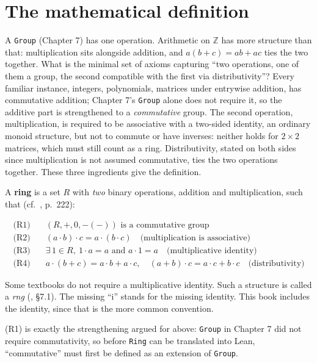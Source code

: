 \section{The mathematical definition}\label{sec:09-rings:01-definition:1}

A \texttt{Group} (Chapter 7) has one operation. Arithmetic on \(\mathbb{Z}\) has more structure than that: multiplication sits alongside addition, and \(a(b+c) = ab+ac\) ties the two together. What is the minimal set of axioms capturing ``two operations, one of them a group, the second compatible with the first via distributivity''? Every familiar instance, integers, polynomials, matrices under entrywise addition, has commutative addition; Chapter 7's \texttt{Group} alone does not require it, so the additive part is strengthened to a \emph{commutative} group. The second operation, multiplication, is required to be associative with a two-sided identity, an ordinary monoid structure, but not to commute or have inverses: neither holds for \(2 \times 2\) matrices, which must still count as a ring. Distributivity, stated on both sides since multiplication is not assumed commutative, ties the two operations together. These three ingredients give the definition.

A \textbf{ring} is a set \(R\) with \emph{two} binary operations, addition and multiplication, such that (cf.~\cite{DummitFoote2003}, p.~222):

\[
\begin{aligned}
\text{(R1)}&\quad (R, +, 0, -(-)) \text{ is a commutative group} \\
\text{(R2)}&\quad (a \cdot b) \cdot c = a \cdot (b \cdot c) \quad \text{(multiplication is associative)} \\
\text{(R3)}&\quad \exists\, 1 \in R,\ 1 \cdot a = a \text{ and } a \cdot 1 = a \quad \text{(multiplicative identity)} \\
\text{(R4)}&\quad a \cdot (b + c) = a \cdot b + a \cdot c, \quad (a + b) \cdot c = a \cdot c + b \cdot c \quad \text{(distributivity)}
\end{aligned}
\]

Some textbooks do not require a multiplicative identity. Such a structure is called a \emph{rng} (\cite{DummitFoote2003}, §7.1). The missing ``i'' stands for the missing identity. This book includes the identity, since that is the more common convention.

(R1) is exactly the strengthening argued for above: \texttt{Group} in Chapter 7 did not require commutativity, so before \texttt{Ring} can be translated into Lean, ``commutative'' must first be defined as an extension of \texttt{Group}.


